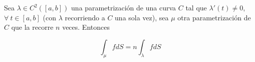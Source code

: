 \begin{teo}
    Sea $\lambda \in C^2([a,b])$ una parametrización de una curva $C$ tal que $\lambda'(t) \neq 0$, $\forall~t \in [a,b]$ (con $\lambda$ recorriendo a $C$ una sola vez), sea $\mu$ otra parametrización de $C$ que la recorre $n$ veces. Entonces

    \[
    \int_{\mu} fdS = n \int_{\lambda} fdS
    \]
\end{teo}
